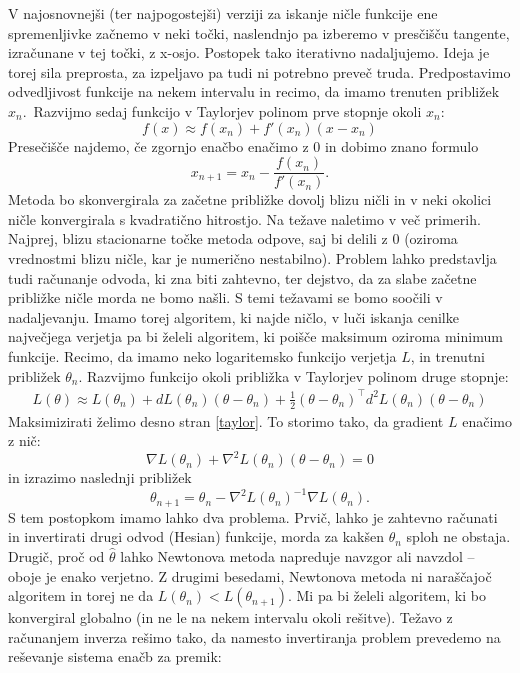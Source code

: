 \documentclass[12pt,a4paper]{amsart}
\theoremstyle{definition} %
\theoremstyle{plain} %
\begin{document}
V najosnovnejši (ter najpogostejši) verziji za iskanje
ničle funkcije ene spremenljivke začnemo v neki točki, naslendnjo pa izberemo v presčišču tangente, izračunane v 
tej točki, z x-osjo. Postopek tako iterativno nadaljujemo. Ideja je torej sila preprosta, za izpeljavo pa tudi ni potrebno preveč truda.
Predpostavimo odvedljivost funkcije na nekem intervalu in recimo, da imamo trenuten približek $x_{n}.$~Razvijmo sedaj funkcijo v Taylorjev
polinom prve stopnje okoli $x_{n}:$
\[
    f(x) \approx f(x_{n}) + f'(x_{n})(x - x_{n})
\]
Presečišče najdemo, če zgornjo enačbo enačimo z 0 in dobimo znano formulo
\[
    x_{n+1} = x_{n} - \frac{f(x_{n})}{f'(x_{n})}.
\]
Metoda bo skonvergirala za začetne približke dovolj blizu ničli in v neki okolici ničle konvergirala s kvadratično hitrostjo. 
Na težave naletimo v več primerih. Najprej, blizu stacionarne točke metoda odpove, saj bi delili z 0 (oziroma vrednostmi blizu ničle, kar je numerično nestabilno).
Problem lahko predstavlja tudi računanje odvoda, ki zna biti zahtevno, ter dejstvo, da za slabe začetne približke ničle morda ne bomo našli. S temi 
težavami se bomo soočili v nadaljevanju.
Imamo torej algoritem, ki najde ničlo, v luči iskanja cenilke največjega verjetja pa bi želeli algoritem, ki poišče maksimum oziroma minimum funkcije.
Recimo, da imamo neko logaritemsko funkcijo verjetja $L$, in trenutni približek $\theta_{n}$. Razvijmo funkcijo okoli približka v Taylorjev polinom
druge stopnje:
\begin{align}
    L(\theta) \approx L(\theta_{n}) + dL(\theta_{n})(\theta - \theta_{n}) + \frac{1}{2}(\theta - \theta_{n})^\top d^{2}L(\theta_{n})(\theta - \theta_{n}) \label{taylor}   
\end{align}
Maksimizirati želimo desno stran \eqref{taylor}. To storimo tako, da gradient $L$ enačimo z nič:
\[
    \nabla L(\theta_{n}) + \nabla^2L(\theta_{n})(\theta - \theta_{n}) = 0  
\]
in izrazimo naslednji približek
\[
    \theta_{n + 1} = \theta_{n} - \nabla^{2}L(\theta_{n})^{-1}\nabla L(\theta_{n}).
\]
S tem postopkom imamo lahko dva problema. Prvič, lahko je zahtevno računati in invertirati drugi odvod (Hesian) funkcije, morda za kakšen $\theta_{n}$ sploh ne obstaja.
Drugič, proč od $\hat{\theta}$ lahko Newtonova metoda napreduje navzgor ali navzdol -- oboje je enako verjetno. Z drugimi besedami, Newtonova metoda ni naraščajoč algoritem in torej
ne da $L(\theta_{n}) < L(\theta_{n+1}).$ Mi pa bi želeli algoritem, ki bo konvergiral globalno (in ne le na nekem intervalu okoli rešitve).
Težavo z računanjem inverza rešimo tako, da namesto invertiranja problem prevedemo na reševanje sistema enačb za premik:
\end{document}
